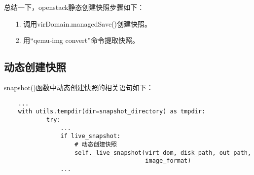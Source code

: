 \documentclass[a4paper,left=1.5cm,right=1.5cm,11pt]{article}
\begin{document}
	总结一下，openstack静态创建快照步骤如下：
	\begin{itemize}
		\item[1.] 调用virDomain.managedSave()创建快照。
		\item[2.] 用“qemu-img convert”命令提取快照。
	\end{itemize}

\subsection{动态创建快照}
	snapshot()函数中动态创建快照的相关语句如下：
	\begin{lstlisting}
	...
	with utils.tempdir(dir=snapshot_directory) as tmpdir:
            try:
				...
                if live_snapshot:
					# 动态创建快照
                    self._live_snapshot(virt_dom, disk_path, out_path,
                                        image_format)
				...
	\end{lstlisting}
\end{document}
